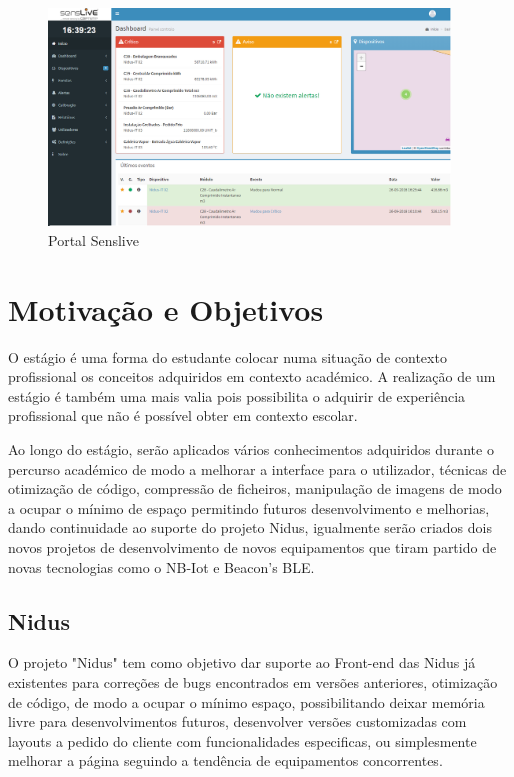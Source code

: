 \begin{figure}[ht]
  \centering
  \includegraphics[width=0.95\textwidth]{images/mwsnap0791.png}
  \caption{ Portal Senslive}\label{figsenslive}
\end{figure}



\section{Motivação e Objetivos}
\par
O estágio é uma forma do estudante colocar numa situação de contexto profissional os conceitos adquiridos em contexto académico. A realização de um estágio é também uma mais valia pois possibilita o adquirir de experiência profissional que não é possível obter em contexto escolar.
\par
Ao longo do estágio, serão aplicados vários conhecimentos adquiridos durante o percurso académico de modo a melhorar a interface para o utilizador, técnicas de otimização de código, compressão de ficheiros, manipulação de imagens de modo a ocupar o mínimo de espaço permitindo futuros desenvolvimento e melhorias, dando continuidade ao suporte do projeto Nidus, igualmente serão criados dois novos projetos de desenvolvimento de novos equipamentos que tiram partido de novas tecnologias como o NB-Iot e Beacon’s BLE.
\subsection{Nidus}
\par
O projeto "Nidus" tem como objetivo dar suporte ao Front-end das Nidus já existentes para correções de bugs encontrados em versões anteriores, otimização de código, de modo a ocupar o mínimo espaço, possibilitando deixar memória livre para desenvolvimentos futuros, desenvolver versões customizadas com layouts a pedido do cliente com funcionalidades especificas, ou simplesmente melhorar a página seguindo a tendência de equipamentos concorrentes.
